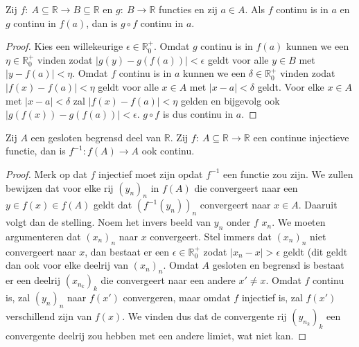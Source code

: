 \documentclass[main.tex]{subfiles}
\begin{document}
\begin{bpr}
  Zij $f:\ A \subseteq \mathbb{R} \rightarrow B \subseteq \mathbb{R}$ en $g:\ B \rightarrow \mathbb{R}$ functies en zij $a\in A$.
  Als $f$ continu is in $a$ en $g$ continu in $f(a)$, dan is $g\circ f$ continu in $a$.

  \begin{proof}
    Kies een willekeurige $\epsilon \in \mathbb{R}_{0}^{+}$.
    Omdat $g$ continu is in $f(a)$ kunnen we een $\eta\in\mathbb{R}_{0}^{+}$ vinden zodat $|g(y)-g(f(a))|<\epsilon$ geldt voor alle $y\in B$ met $|y-f(a)|<\eta$.
    Omdat $f$ continu is in $a$ kunnen we een $\delta\in \mathbb{R}_{0}^{+}$ vinden zodat $|f(x)-f(a)| < \eta$ geldt voor alle $x\in A$ met $|x-a|<\delta$ geldt.
    Voor elke $x\in A$ met $|x-a|<\delta$ zal $|f(x)-f(a)| < \eta$ gelden en bijgevolg ook $|g(f(x))-g(f(a))|<\epsilon$.
    $g\circ f$ is dus continu in $a$.
  \end{proof}
\end{bpr}

\begin{bpr}
  Zij $A$ een gesloten begrensd deel van $\mathbb{R}$.
  Zij $f: \ A \subseteq \mathbb{R} \rightarrow \mathbb{R}$ een continue injectieve functie, dan is $f^{-1}: f(A) \rightarrow A$ ook continu.

  \begin{proof}
    Merk op dat $f$ injectief moet zijn opdat $f^{-1}$ een functie zou zijn.
    We zullen bewijzen dat voor elke rij $(y_{n})_{n}$ in $f(A)$ die convergeert naar een $y\in f(x) \in f(A)$ geldt dat $(f^{-1}(y_{n}))_{n}$ convergeert naar $x\in A$.
    Daaruit volgt dan de stelling.
    Noem het invers beeld van $y_{n}$ onder $f$ $x_{n}$.
    We moeten argumenteren dat $(x_{n})_{n}$ naar $x$ convergeert.
    Stel immers dat $(x_{n})_{n}$ niet convergeert naar $x$, dan bestaat er een $\epsilon \in \mathbb{R}_{0}^{+}$ zodat $|x_{n}-x|> \epsilon$ geldt (dit geldt dan ook voor elke deelrij van $(x_{n})_{n}$.
    Omdat $A$ gesloten en begrensd is bestaat er een deelrij $(x_{n_{k}})_{k}$ die convergeert naar een andere $x'\neq x$.
    Omdat $f$ continu is, zal $(y_{n})_{n}$ naar $f(x')$ convergeren, maar omdat $f$ injectief is, zal $f(x')$ verschillend zijn van $f(x)$.
    We vinden dus dat de convergente rij $(y_{n_{k}})_{k}$ een convergente deelrij zou hebben met een andere limiet, wat niet kan.\needed
  \end{proof}
\end{bpr}
\end{document}
